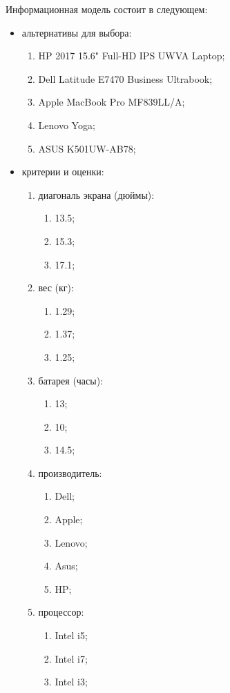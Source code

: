 \documentclass[titlepage]{article}
\begin{document}
Информационная модель состоит в следующем:
\begin{itemize}
\item альтернативы для выбора:
\begin{enumerate}
\item HP 2017 15.6" Full-HD IPS UWVA Laptop;
\item Dell Latitude E7470 Business Ultrabook;
\item Apple MacBook Pro MF839LL/A;
\item Lenovo Yoga;
\item ASUS K501UW-AB78;
\end{enumerate}
\item критерии и оценки:
	\begin{enumerate}
		\item диагональ экрана (дюймы):
			\begin{enumerate}
			\item 13.5;
			\item 15.3;
			\item 17.1;
			\end{enumerate}
		\item вес (кг):
			\begin{enumerate}
				\item 1.29;
				\item 1.37;
				\item 1.25;
			\end{enumerate}
		\item батарея (часы):
			\begin{enumerate}
				\item 13;
				\item 10;
				\item 14.5;
			\end{enumerate}
		\item производитель:
			\begin{enumerate}
				\item Dell;
				\item Apple;
				\item Lenovo;
				\item Asus;
				\item HP;
			\end{enumerate}
		\item процессор:
			\begin{enumerate}
				\item Intel i5;
				\item Intel i7;
				\item Intel i3;
			\end{enumerate}

\end{enumerate}
\end{itemize}
\end{document}
